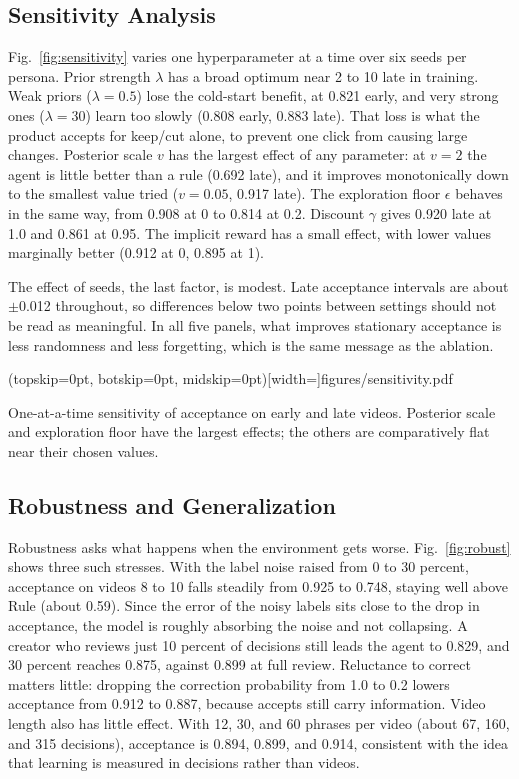 \documentclass{ieeeaccess}
\begin{document}
\subsection{Sensitivity Analysis}
Fig.~\ref{fig:sensitivity} varies one hyperparameter at a time over six seeds per persona. Prior strength $\lambda$ has a broad optimum near 2 to 10 late in training. Weak priors ($\lambda=0.5$) lose the cold-start benefit, at 0.821 early, and very strong ones ($\lambda=30$) learn too slowly (0.808 early, 0.883 late). That loss is what the product accepts for keep/cut alone, to prevent one click from causing large changes. Posterior scale $v$ has the largest effect of any parameter: at $v=2$ the agent is little better than a rule (0.692 late), and it improves monotonically down to the smallest value tried ($v=0.05$, 0.917 late). The exploration floor $\epsilon$ behaves in the same way, from 0.908 at 0 to 0.814 at 0.2. Discount $\gamma$ gives 0.920 late at 1.0 and 0.861 at 0.95. The implicit reward has a small effect, with lower values marginally better (0.912 at 0, 0.895 at 1).

The effect of seeds, the last factor, is modest. Late acceptance intervals are about $\pm$0.012 throughout, so differences below two points between settings should not be read as meaningful. In all five panels, what improves stationary acceptance is less randomness and less forgetting, which is the same message as the ablation.

\Figure[t!](topskip=0pt, botskip=0pt, midskip=0pt)[width=\textwidth]{figures/sensitivity.pdf}
{\parbox[t]{0.91\textwidth}{\raggedright One-at-a-time sensitivity of acceptance on early and late videos. Posterior scale and exploration floor have the largest effects; the others are comparatively flat near their chosen values.}\label{fig:sensitivity}}

\subsection{Robustness and Generalization}
Robustness asks what happens when the environment gets worse. Fig.~\ref{fig:robust} shows three such stresses. With the label noise raised from 0 to 30 percent, acceptance on videos 8 to 10 falls steadily from 0.925 to 0.748, staying well above Rule (about 0.59). Since the error of the noisy labels sits close to the drop in acceptance, the model is roughly absorbing the noise and not collapsing. A creator who reviews just 10 percent of decisions still leads the agent to 0.829, and 30 percent reaches 0.875, against 0.899 at full review. Reluctance to correct matters little: dropping the correction probability from 1.0 to 0.2 lowers acceptance from 0.912 to 0.887, because accepts still carry information. Video length also has little effect. With 12, 30, and 60 phrases per video (about 67, 160, and 315 decisions), acceptance is 0.894, 0.899, and 0.914, consistent with the idea that learning is measured in decisions rather than videos.
\end{document}
